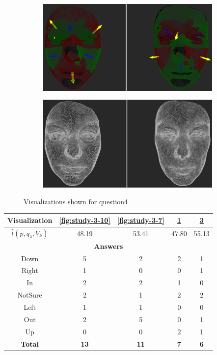 \begin{figure}[h]
\begin{subfigure}{0.4\textwidth}
\includegraphics[width=\textwidth]{./screenshots/pair9.PNG}
\caption{}
\label{fig:study-3-9}
\end{subfigure}
\quad
\begin{subfigure}{0.4\textwidth}
\includegraphics[width=\textwidth]{./screenshots/pair6.PNG}
\caption{}
\label{fig:study-3-6}
\end{subfigure}
\caption{Visualizations shown for question4}
\end{figure}
\medskip

\begin{center}
\begin{tabular}{| c | c | c | c | c |}
	\hline
	Visualization & \ref{fig:study-3-10} & \ref{fig:study-3-7} & \ref{fig:study-3-9} & \ref{fig:study-3-6}\\ \hline
	\(\widehat{t}(p, q_4, V_k)\) & 48.19 & 53.41 & 47.80 & 55.13\\ \hline
	\multicolumn{5}{|c|}{\bf Answers} \\ \hline
	Down & 5 & 2 & 2 & 1\\ \hline
	Right & 1 & 0 & 0 & 1\\ \hline
	In & 2 & 2 & 1 & 0\\ \hline
	NotSure & 2 & 1 & 2 & 2\\ \hline
	Left & 1 & 1 & 0 & 0\\ \hline
	Out & 2 & 5 & 0 & 1\\ \hline
	Up & 0 & 0 & 2 & 1\\ \hline
	{\bf Total} & {\bf 13} & {\bf 11} & {\bf 7} & {\bf 6}\\ \hline
\end{tabular}
\end{center}
\clearpage

